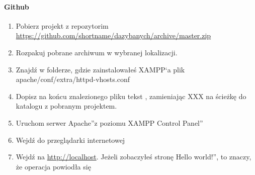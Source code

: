 \documentclass[a4paper, 12pt]{article}
\begin{document}
\paragraph{Github}
\begin{enumerate}
	\item Pobierz projekt z repozytorim \url{https://github.com/shortname/dazybanych/archive/master.zip}
	\item Rozpakuj pobrane archiwum w wybranej lokalizacji.
	\item Znajdź w folderze, gdzie zainstalowałeś XAMPP`a plik apache/conf/extra/httpd-vhosts.conf
	\item Dopisz na końcu znalezionego pliku tekst , zamieniając XXX na ścieżkę do katalogu z pobranym projektem.
	\item Uruchom serwer \quotedblbase Apache\textquotedblright z poziomu \quotedblbase XAMPP Control Panel\textquotedblright
	\item Wejdź do przeglądarki internetowej
	\item Wejdź na \url{http://localhost}. Jeżeli zobaczyłeś stronę \quotedblbase Hello world!\textquotedblright, to znaczy, że operacja powiodła się
\end{enumerate}
\end{document}
